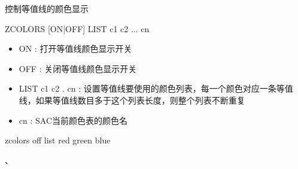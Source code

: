 \label{cmd:zcolors}

控制等值线的颜色显示

\begin{SACSTX}
ZCOLORS  [ON|OFF] LIST c1 c2 ... cn
\end{SACSTX}

\begin{itemize}
\item ON : 打开等值线颜色显示开关 
\item OFF : 关闭等值线颜色显示开关 
\item LIST c1 c2 . cn : 设置等值线要使用的颜色列表，每一个颜色对应一条等值线，如果等值线数目多于这个列表长度，则整个列表不断重复 
\item cn :  SAC当前颜色表的颜色名 
\end{itemize}

\begin{SACDFT}
zcolors off list red green blue
\end{SACDFT}

、
